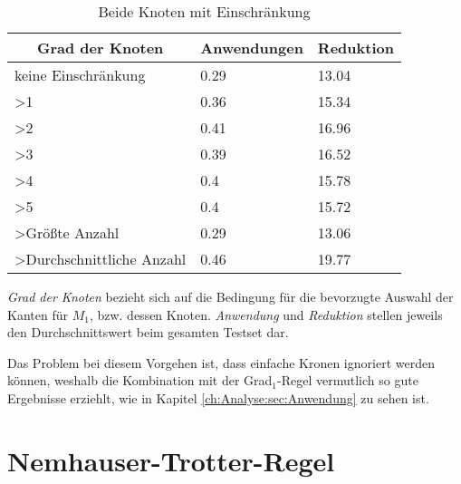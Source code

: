 \begin{table}[htb]
\caption{Beide Knoten mit Einschränkung\label{tab:degreeAND}}
\vspace*{1em}
\centering

\bgroup
\def\arraystretch{1.3}%

\begin{threeparttable}

\begin{tabular}[c]{lll}
	\hline
	\multicolumn{1}{c}{\textbf{Grad der Knoten}} & 
	\multicolumn{1}{c}{\textbf{Anwendungen}} & 
	\multicolumn{1}{c}{\textbf{Reduktion}} \\ 
	
	\hline

	keine Einschränkung&0.29&13.04\\
	>1&0.36 &15.34 \\
	>2&0.41 &16.96 \\
	>3& 0.39& 16.52 \\
	>4& 0.4 &15.78 \\
	>5& 0.4 & 15.72\\
	>Größte Anzahl& 0.29 &13.06 \\
	>Durchschnittliche Anzahl& 0.46&19.77 \\
	\hline
\end{tabular}
\begin{tablenotes}\footnotesize
\item \emph{Grad der Knoten} bezieht sich auf die Bedingung für die bevorzugte Auswahl der Kanten für $M_{1}$, bzw. dessen Knoten. \emph{Anwendung} und \emph{Reduktion} stellen jeweils den Durchschnittswert beim gesamten Testset dar.
\end{tablenotes}

\end{threeparttable}

\egroup

\end{table}

Das Problem bei diesem Vorgehen ist, dass einfache Kronen ignoriert werden können, weshalb die Kombination mit der Grad$_{1}$-Regel vermutlich so gute Ergebnisse erziehlt, wie in Kapitel \ref{ch:Analyse:sec:Anwendung} zu sehen ist.





\section{Nemhauser-Trotter-Regel}
\label{ch:Implementierung:sec:Trott}

